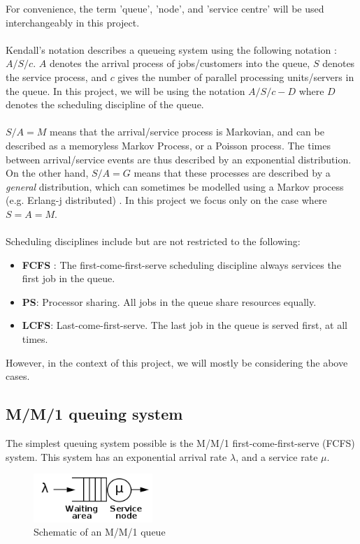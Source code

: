 For convenience, the term 'queue', 'node', and  'service centre' will be used interchangeably in this project. 
\\\\
Kendall's notation describes a queueing system using the following notation : \(A/S/c\). \(A\) denotes the arrival process of jobs/customers into the queue, \(S\) denotes the service process, and \(c\) gives the number of parallel processing units/servers in the queue. In this project, we will be using the notation \(A/S/c-D\) where \(D\) denotes the scheduling discipline of the queue.
\\\\
\(S/A=M\) means that the arrival/service process is Markovian, and can be described as a memoryless Markov Process, or a Poisson process. The times between arrival/service events are thus described by an exponential distribution. On the other hand, \(S/A=G\) means that these processes are described by a \textit{general} distribution, which can sometimes be modelled using a Markov process (e.g. Erlang-j distributed) \cite{BalsamoProductNetworks}. In this project we focus only on the case where \(S=A=M\). 
\\\\
Scheduling disciplines include but are not restricted to the following:
\begin{itemize}[noitemsep]
    \item \textbf{FCFS} : The first-come-first-serve scheduling discipline always services the first job in the queue.
    \item \textbf{PS}: Processor sharing. All jobs in the queue share resources equally.
    \item \textbf{LCFS}: Last-come-first-serve. The last job in the queue is served first, at all times.
\end{itemize}
However, in the context of this project, we will mostly be considering the above cases.

\subsection{M/M/1 queuing system} \label{sec:MM1Qsystem}
The simplest queuing system possible is the M/M/1 first-come-first-serve (FCFS) system. This system has an exponential arrival rate \(\lambda\), and a service rate \(\mu\).

\begin{figure}[H]
\begin{center}
\includegraphics[width=0.4\textwidth]{Chap2_AlgorithmsPFQN/MM1_diagram.png}
\caption{Schematic of an M/M/1 queue}
\label{fig:MM1_schematic}
\end{center}
\end{figure}

